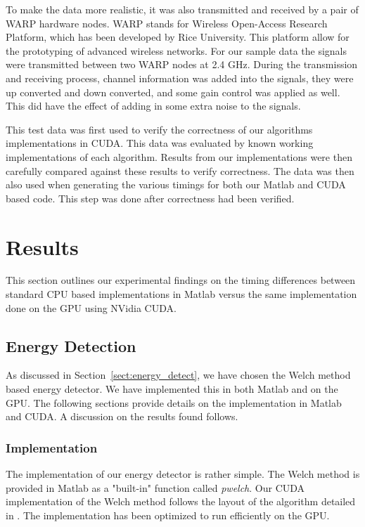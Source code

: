 To make the data more realistic, it was also transmitted and received by a pair of WARP hardware nodes.  WARP stands for Wireless Open-Access Research Platform, which has been developed by Rice University.  This platform allow for the prototyping of advanced wireless networks.  For our sample data the signals were transmitted between two WARP nodes at 2.4 GHz.  During the transmission and receiving process, channel information was added into the signals, they were up converted and down converted, and some gain control was applied as well.  This did have the effect of adding in some extra noise to the signals.

This test data was first used to verify the correctness of our algorithms implementations in CUDA.  This data was evaluated by known working implementations of each algorithm.  Results from our implementations were then carefully compared against these results to verify correctness.  The data was then also used when generating the various timings for both our Matlab and CUDA based code.  This step was done after correctness had been verified.

\section{Results}
\label{sect:gpu_results}
This section outlines our experimental findings on the timing differences between standard CPU based implementations in Matlab versus the same implementation done on the GPU using NVidia CUDA.

\subsection{Energy Detection}
\label{sect:energy_detect_result}
As discussed in Section~\ref{sect:energy_detect}, we have chosen the Welch method based energy detector.  We have implemented this in both Matlab and on the GPU.  The following sections provide details on the implementation in Matlab and CUDA.  A discussion on the results found follows.

\subsubsection{Implementation}
The implementation of our energy detector is rather simple.  The Welch method is provided in Matlab as a "built-in" function called \textit{pwelch}.  Our CUDA implementation of the Welch method follows the layout of the algorithm detailed in \cite{Welch67}.  The implementation has been optimized to run efficiently on the GPU.
